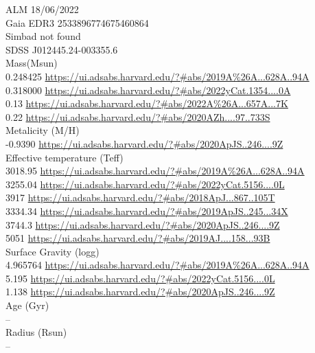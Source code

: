 ALM 18/06/2022\\
Gaia EDR3 2533896774675460864\\
Simbad not found\\
SDSS J012445.24-003355.6\\
Mass(Msun)\\
0.248425 \url{https://ui.adsabs.harvard.edu/?#abs/2019A%26A...628A..94A}\\
0.318000 \url{https://ui.adsabs.harvard.edu/?#abs/2022yCat.1354....0A}\\
0.13 \url{https://ui.adsabs.harvard.edu/?#abs/2022A%26A...657A...7K}\\
0.22 \url{https://ui.adsabs.harvard.edu/?#abs/2020AZh....97..733S}\\
Metalicity (M/H)\\
-0.9390 \url{https://ui.adsabs.harvard.edu/?#abs/2020ApJS..246....9Z}\\
Effective temperature (Teff) \\
3018.95 \url{https://ui.adsabs.harvard.edu/?#abs/2019A%26A...628A..94A}\\
3255.04 \url{https://ui.adsabs.harvard.edu/?#abs/2022yCat.5156....0L}\\
3917 \url{https://ui.adsabs.harvard.edu/?#abs/2018ApJ...867..105T}\\
3334.34 \url{https://ui.adsabs.harvard.edu/?#abs/2019ApJS..245...34X}\\
3744.3 \url{https://ui.adsabs.harvard.edu/?#abs/2020ApJS..246....9Z}\\
5051 \url{https://ui.adsabs.harvard.edu/?#abs/2019AJ....158...93B}\\
Surface Gravity (logg) \\
4.965764 \url{https://ui.adsabs.harvard.edu/?#abs/2019A%26A...628A..94A}\\
5.195 \url{https://ui.adsabs.harvard.edu/?#abs/2022yCat.5156....0L}\\
1.138 \url{https://ui.adsabs.harvard.edu/?#abs/2020ApJS..246....9Z}\\
Age (Gyr)\\
--\\
Radius (Rsun)\\
--\\
